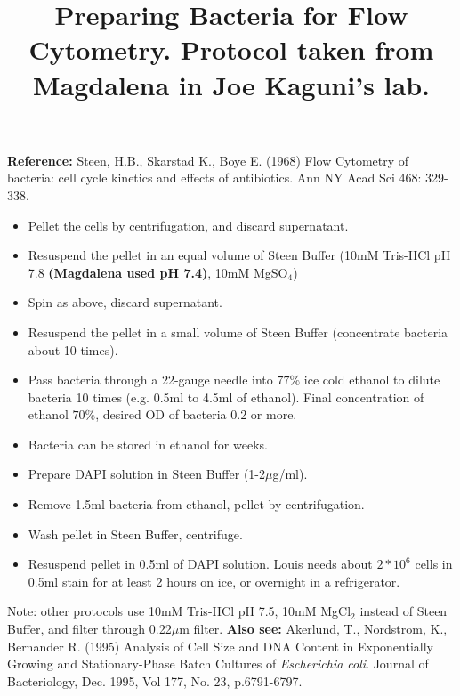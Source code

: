 \documentclass{article}
\begin{document}
\title{Preparing Bacteria for Flow Cytometry. Protocol taken from Magdalena
 in Joe Kaguni's lab.}
\maketitle

\textbf{Reference:} Steen, H.B., Skarstad K., Boye E. (1968) Flow Cytometry of
bacteria: cell cycle kinetics and effects of antibiotics. Ann NY Acad Sci 468:
329-338.
\newline\newline
\begin{itemize}
\item{Pellet the cells by centrifugation, and discard supernatant.}
\item{Resuspend the pellet in an equal volume of Steen Buffer
(10mM Tris-HCl pH 7.8 \textbf{(Magdalena used pH 7.4)},
10mM MgSO$_{4}$)}
\item{Spin as above, discard supernatant.}
\item{Resuspend the pellet in a small volume of Steen Buffer (concentrate 
bacteria about 10 times).}
\item{Pass bacteria through a 22-gauge needle into $77\%$ ice cold ethanol to 
dilute bacteria 10 times (e.g. 0.5ml to 4.5ml of ethanol). Final concentration
of ethanol $70\%$, desired OD of bacteria 0.2 or more.}
\item{Bacteria can be stored in ethanol for weeks.}
\item{Prepare DAPI solution in Steen Buffer (1-2$\mu$g/ml).}
\item{Remove 1.5ml bacteria from ethanol, pellet by centrifugation.}
\item{Wash pellet in Steen Buffer, centrifuge.}
\item{Resuspend pellet in 0.5ml of DAPI solution. Louis needs about $2*10^{6}$
cells in 0.5ml stain for at least 2 hours on ice, or overnight in a 
refrigerator.}
\end{itemize}
Note: other protocols use 10mM Tris-HCl pH 7.5, 10mM MgCl$_{2}$ instead of
Steen Buffer, and filter through 0.22$\mu$m filter.
\newline\newline
\textbf{Also see:} Akerlund, T., Nordstrom, K., Bernander R. (1995) Analysis
of Cell Size and DNA Content in Exponentially Growing and Stationary-Phase
Batch Cultures of \textit{Escherichia coli}. Journal of Bacteriology, Dec.
1995, Vol 177, No. 23, p.6791-6797.
\end{document}
